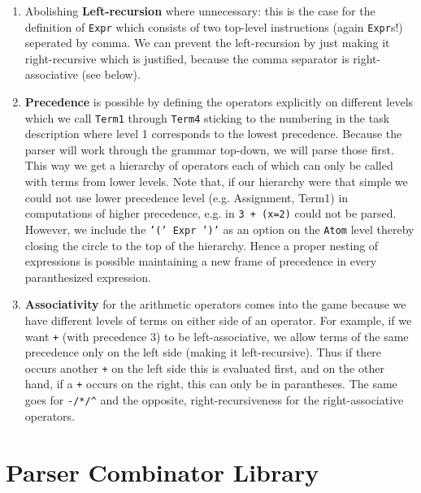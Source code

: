 \documentclass{article}
\begin{document}
\begin{enumerate}
 \item Abolishing \textbf{Left-recursion} where unnecessary: this is the case for the definition of \texttt{Expr} which consists of two top-level instructions (again \texttt{Expr}s!) seperated by comma. We can prevent the left-recursion by just making it right-recursive which is justified, because the comma separator is right-associative (see below).

 \item \textbf{Precedence} is possible by defining the operators explicitly on different levels which we call \texttt{Term1} through \texttt{Term4} sticking to
 the numbering in the task description where level 1 corresponds to the lowest precedence. Because the parser will work through the grammar top-down, we will parse those first.
 This way we get a hierarchy of operators each of which can only be called with terms from lower levels. 
Note that, if our hierarchy were that simple we could not use lower precedence level (e.g. Assignment, Term1) in computations of higher precedence, e.g. in \texttt{3 + (x=2)} could not be parsed. However, we include the \texttt{'(' Expr ')'} as an option on the \texttt{Atom} level thereby closing the circle to the top of the hierarchy. Hence a proper nesting of expressions is possible maintaining a new frame of precedence in every paranthesized expression.
 
 \item \textbf{Associativity} for the arithmetic operators comes into the game because we have different levels of terms on either side of an operator. For example, if we want \texttt{+} (with precedence 3) to be left-associative, we allow terms of the same precedence only on the left side (making it left-recursive). Thus if there occurs another \texttt{+} on the left side this is evaluated first, and on the other hand, if a \texttt{+} occurs on the right, this can only be in parantheses. The same goes for \texttt{-/*/\^} and the opposite, right-recursiveness for the right-associative operators.
\end{enumerate}

\section{Parser Combinator Library}
\end{document}
